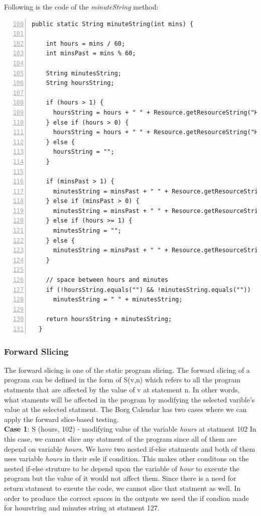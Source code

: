 \documentclass[fontsize=12pt,paper=letter,twoside]{scrartcl}
\begin{document}
\noindent Following is the code of the \emph{minuteString} method:
\begin{lstlisting}[numbers=left,firstnumber=100]
  public static String minuteString(int mins) {
    
    int hours = mins / 60;
    int minsPast = mins % 60;
    
    String minutesString;
    String hoursString;
    
    if (hours > 1) {
      hoursString = hours + " " + Resource.getResourceString("Hours");
    } else if (hours > 0) {
      hoursString = hours + " " + Resource.getResourceString("Hour");
    } else {
      hoursString = "";
    }

    if (minsPast > 1) {
      minutesString = minsPast + " " + Resource.getResourceString("Minutes");
    } else if (minsPast > 0) {
      minutesString = minsPast + " " + Resource.getResourceString("Minute");
    } else if (hours >= 1) {
      minutesString = "";
    } else {
      minutesString = minsPast + " " + Resource.getResourceString("Minutes");
    }

    // space between hours and minutes
    if (!hoursString.equals("") && !minutesString.equals(""))
      minutesString = " " + minutesString;

    return hoursString + minutesString;
  }
\end{lstlisting}

\subsubsection{Forward Slicing}

The forward slicing is one of the static program slicing. The forward slicing of a program  can be defined in the form of S(v,n)  which refers to all the program statments that are affected by the value of v at statement n. In other words, what staments will be affected in the program by modifying the selected varible's value at the selected statment. The Borg Calendar has two cases where we can apply the forward slice-based testing.
\newline
\\ \textbf {Case 1}: S (hours, 102) -  modifying value of  the variable \emph{hours} at statment 102
\newline
\newline
 In this case, we cannot slice any statment of the program since all of them are depend on variable \emph{hours}. We have two  nested if-else statments and both of them uses variable \emph{hours} in their esle if condition. This makes other conditons on the nested if-else struture to be depend upon the variable of \emph{hour} to execute the program but the value of it would not affect them. Since there is a need for return statment to exeute the code, we cannot slice that statment as well. In order to produce the correct spaces in the outputs we need the if condion made for hourstring and minutes string at statment 127.
 
\end{document}
